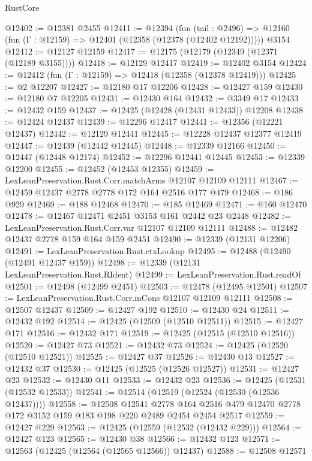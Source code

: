 \begin{lexlean}{RustCore}
\begin{coremodule}
@12402 := @12381 @2455
@12411 := @12394
    (fun (tail : @2496) => @12160 (fun (Γ : @12159) => @12401 (@12358 (@12378 (@12402 @12192)))))
    @3154
@12412 := @12127 @12159
@12417 := @12175 (@12179 (@12349 (@12371 (@12189 @3155))))
@12418 := @12129 @12417
@12419 := @12402 @3154
@12424 := @12412 (fun (Γ : @12159) => @12418 (@12358 (@12378 @12419)))
@12425 := @2 @12207
@12427 := @12180 @17 @12206
@12428 := @12427 @159
@12430 := @12180 @7 @12205
@12431 := @12430 @164
@12432 := @3349 @17
@12433 := @12432 @159
@12437 := @12425 (@12428 (@12431 @12433)) @12208
@12438 := @12424 @12437
@12439 := @12296 @12417
@12441 := @12356 (@12221 @12437)
@12442 := @12129 @12441
@12445 := @12228 @12437 @12377 @12419
@12447 := @12439 (@12442 @12445)
@12448 := @12339 @12166
@12450 := @12447 (@12448 @12174)
@12452 := @12296 @12441 @12445
@12453 := @12339 @12200
@12455 := @12452 (@12453 @12355)
@12459 := LexLeanPreservation.Rust.Corr.matchArms @12107 @12109 @12111
@12467 := @12459 @12437 @2778 @2778 @172 @164 @2516 @177 @479
@12468 := @186 @929
@12469 := @188 @12468
@12470 := @185 @12469
@12471 := @160 @12470
@12478 := @12467 @12471 @2451 @3153 @161 @2442 @23 @2448
@12482 := LexLeanPreservation.Rust.Corr.var @12107 @12109 @12111
@12488 := @12482 @12437 @2778 @159 @164 @159 @2451
@12490 := @12339 (@12131 @12206)
@12491 := LexLeanPreservation.Rust.ctxLookup
@12495 := @12488 (@12490 (@12491 @12437 @159))
@12498 := @12339 (@12131 LexLeanPreservation.Rust.RIdent)
@12499 := LexLeanPreservation.Rust.readOf
@12501 := @12498 (@12499 @2451)
@12503 := @12478 (@12495 @12501)
@12507 := LexLeanPreservation.Rust.Corr.mCons @12107 @12109 @12111
@12508 := @12507 @12437
@12509 := @12427 @192
@12510 := @12430 @24
@12511 := @12432 @192
@12514 := @12425 (@12509 (@12510 @12511))
@12515 := @12427 @171
@12516 := @12432 @171
@12519 := @12425 (@12515 (@12510 @12516))
@12520 := @12427 @73
@12521 := @12432 @73
@12524 := @12425 (@12520 (@12510 @12521))
@12525 := @12427 @37
@12526 := @12430 @13
@12527 := @12432 @37
@12530 := @12425 (@12525 (@12526 @12527))
@12531 := @12427 @23
@12532 := @12430 @11
@12533 := @12432 @23
@12536 := @12425 (@12531 (@12532 @12533))
@12541 := @12514 (@12519 (@12524 (@12530 (@12536 @12437))))
@12558 := @12508
    @12541
    @2778
    @164
    @2516
    @479
    @12470
    @2778
    @172
    @3152
    @159
    @183
    @198
    @220
    @2489
    @2454
    @2454
    @2517
@12559 := @12427 @229
@12563 := @12425 (@12559 (@12532 (@12432 @229)))
@12564 := @12427 @123
@12565 := @12430 @38
@12566 := @12432 @123
@12571 := @12563 (@12425 (@12564 (@12565 @12566)) @12437)
@12588 := @12508
    @12571

\end{coremodule}
\end{lexlean}
